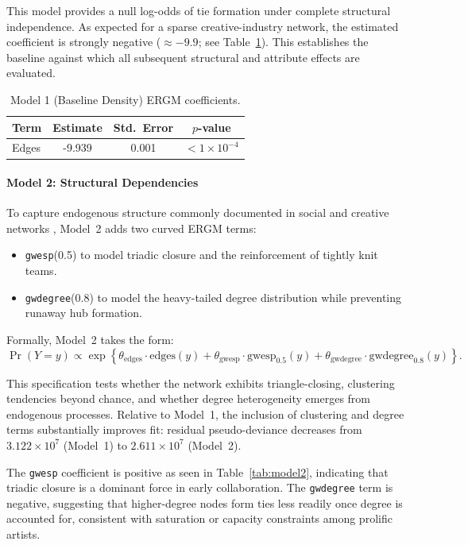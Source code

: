 \documentclass[fleqn,10pt]{wlscirep}
\begin{document}
This model provides a null log-odds of tie formation under complete structural independence. As expected for a sparse creative-industry network, the estimated coefficient is strongly negative ($\approx -9.9$; see Table~\ref{tab:model1}). This establishes the baseline against which all subsequent structural and attribute effects are evaluated.

\begin{table}[h!]
\centering
\caption{Model 1 (Baseline Density) ERGM coefficients.}
\footnotesize
\begin{tabular}{lccc}
\hline
Term & Estimate & Std.\ Error & $p$-value \\
\hline
Edges & -9.939 & 0.001 & $< 1 \times 10^{-4}$ \\
\hline
\end{tabular}
\label{tab:model1}
\end{table}

\paragraph*{Model 2: Structural Dependencies}
To capture endogenous structure commonly documented in social and creative networks \cite{Wasserman1994SNA}, Model~2 adds two curved ERGM terms:
\begin{itemize}
    \item \texttt{gwesp}(0.5) to model triadic closure and the reinforcement of tightly knit teams.
    \item \texttt{gwdegree}(0.8) to model the heavy-tailed degree distribution while preventing runaway hub formation.
\end{itemize}

Formally, Model~2 takes the form:
\begin{equation}
\Pr(Y = y) \propto 
\exp\left\{
    \theta_{\text{edges}} \cdot \text{edges}(y)
    + \theta_{\text{gwesp}} \cdot \text{gwesp}_{0.5}(y)
    + \theta_{\text{gwdegree}} \cdot \text{gwdegree}_{0.8}(y)
\right\}.
\label{eq:model1-intext}
\end{equation}

This specification tests whether the network exhibits triangle-closing, clustering tendencies beyond chance, and whether degree heterogeneity emerges from endogenous processes. Relative to Model~1, the inclusion of clustering and degree terms substantially improves fit: residual pseudo-deviance decreases from $3.122\times 10^{7}$ (Model~1) to $2.611\times 10^{7}$ (Model~2).

The \texttt{gwesp} coefficient is positive as seen in Table~\ref{tab:model2}, indicating that triadic closure is a dominant force in early collaboration. The \texttt{gwdegree} term is negative, suggesting that higher-degree nodes form ties less readily once degree is accounted for, consistent with saturation or capacity constraints among prolific artists.
\end{document}
